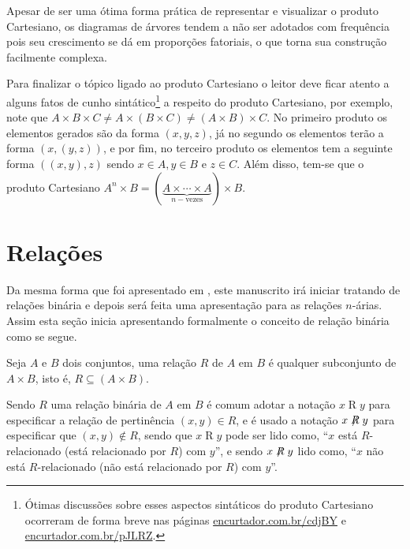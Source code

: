 Apesar de ser uma ótima forma prática de representar e visualizar o produto Cartesiano, os diagramas de árvores tendem a não ser adotados com frequência pois seu crescimento se dá em proporções fatoriais, o que torna sua construção facilmente complexa.

\begin{rema}
	Para finalizar o tópico ligado ao produto Cartesiano o leitor deve ficar atento a alguns fatos de cunho sintático\footnote{Ótimas discussões sobre esses aspectos sintáticos do produto Cartesiano ocorreram de forma breve nas páginas \url{encurtador.com.br/cdjBY} e \url{encurtador.com.br/pJLRZ}.} a respeito do produto Cartesiano, por exemplo, note que $A \times B \times C \neq A \times (B \times C) \neq (A \times B) \times C$. No primeiro produto os elementos gerados são da forma $(x, y, z)$, já no segundo os elementos terão a forma $(x, (y, z))$, e por fim, no terceiro produto os elementos tem a seguinte forma $((x,y), z)$ sendo $x \in A, y \in B$ e $z \in C$. Além disso, tem-se que o produto Cartesiano $A^n \times B = (\underbrace{A \times \cdots \times A}_{n-\text{vezes}}) \times B$. 
\end{rema}

\section{Relações}\label{sec:Relacoes}

Da mesma forma que foi apresentado em \cite{abe1991-TC}, este manuscrito irá iniciar tratando de relações binária e depois será feita uma apresentação para as relações $n$-árias. Assim esta seção inicia apresentando formalmente o conceito de relação binária como se segue.

\begin{definition}\label{def:RelacaoBinaria}
	Seja $A$ e $B$ dois conjuntos, uma relação $R$ de $A$ em $B$ é qualquer subconjunto de $A \times B$, isto é, $R \subseteq (A \times B)$.
\end{definition}

Sendo $R$ uma relação binária de $A$ em $B$ é comum adotar a notação $x\mathrel{R}y$ para especificar a relação de pertinência $(x,y) \in R$, e é usado a notação $x\centernot{R}y$ para especificar que $(x,y) \notin R$, sendo que $x\mathrel{R}y$ pode ser lido como, ``$x$ está $R$-relacionado (está relacionado por $R$) com $y$'', e sendo  $x\centernot{R}y$ lido como, ``$x$ não está $R$-relacionado (não está relacionado por $R$) com $y$''.

